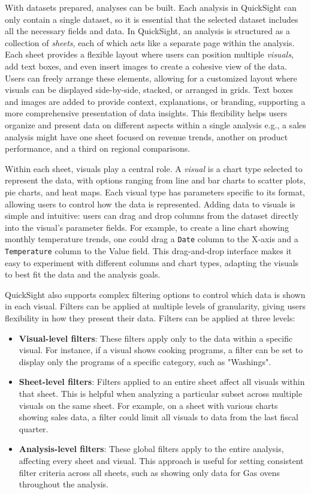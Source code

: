 With datasets prepared, analyses can be built. Each analysis in QuickSight can only contain a single dataset, so it is essential that the selected dataset includes all the necessary fields and data. 
In QuickSight, an analysis is structured as a collection of \textit{sheets}, each of which acts like a separate page within the analysis. Each sheet provides a flexible layout where users can position multiple \textit{visuals}, add text boxes, and even insert images to create a cohesive view of the data. Users can freely arrange these elements, allowing for a customized layout where visuals can be displayed side-by-side, stacked, or arranged in grids. Text boxes and images are added to provide context, explanations, or branding, supporting a more comprehensive presentation of data insights. This flexibility helps users organize and present data on different aspects within a single analysis e.g., a sales analysis might have one sheet focused on revenue trends, another on product performance, and a third on regional comparisons.

Within each sheet, visuals play a central role. A \textit{visual} is a chart type selected to represent the data, with options ranging from line and bar charts to scatter plots, pie charts, and heat maps. Each visual type has parameters specific to its format, allowing users to control how the data is represented. Adding data to visuals is simple and intuitive: users can drag and drop columns from the dataset directly into the visual's parameter fields. For example, to create a line chart showing monthly temperature trends, one could drag a \texttt{Date} column to the X-axis and a \texttt{Temperature} column to the Value field. This drag-and-drop interface makes it easy to experiment with different columns and chart types, adapting the visuals to best fit the data and the analysis goals.

QuickSight also supports complex filtering options to control which data is shown in each visual. Filters can be applied at multiple levels of granularity, giving users flexibility in how they present their data. Filters can be applied at three levels:
\begin{itemize}
    \item \textbf{Visual-level filters}: These filters apply only to the data within a specific visual. For instance, if a visual shows cooking programs, a filter can be set to display only the programs of a specific category, such as "Washings".
    \item \textbf{Sheet-level filters}: Filters applied to an entire sheet affect all visuals within that sheet. This is helpful when analyzing a particular subset across multiple visuals on the same sheet. For example, on a sheet with various charts showing sales data, a filter could limit all visuals to data from the last fiscal quarter.
    \item \textbf{Analysis-level filters}: These global filters apply to the entire analysis, affecting every sheet and visual. This approach is useful for setting consistent filter criteria across all sheets, such as showing only data for Gas ovens throughout the analysis.
\end{itemize}

